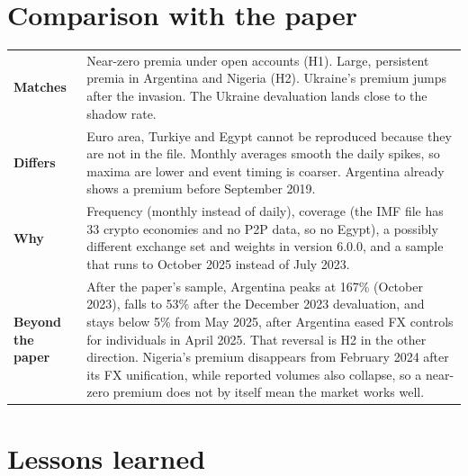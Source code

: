 \documentclass[11pt]{article}
\begin{document}
\section{Comparison with the paper}

\begin{tabular}{p{}p{}}
\toprule
\textbf{Matches} & Near-zero premia under open accounts (H1). Large, persistent premia in Argentina and Nigeria (H2). Ukraine's premium jumps after the invasion. The Ukraine devaluation lands close to the shadow rate. \\
\textbf{Differs} & Euro area, Turkiye and Egypt cannot be reproduced because they are not in the file. Monthly averages smooth the daily spikes, so maxima are lower and event timing is coarser. Argentina already shows a premium before September 2019. \\
\textbf{Why} & Frequency (monthly instead of daily), coverage (the IMF file has 33 crypto economies and no P2P data, so no Egypt), a possibly different exchange set and weights in version 6.0.0, and a sample that runs to October 2025 instead of July 2023. \\
\textbf{Beyond the paper} & After the paper's sample, Argentina peaks at 167\% (October 2023), falls to 53\% after the December 2023 devaluation, and stays below 5\% from May 2025, after Argentina eased FX controls for individuals in April 2025. That reversal is H2 in the other direction. Nigeria's premium disappears from February 2024 after its FX unification, while reported volumes also collapse, so a near-zero premium does not by itself mean the market works well. \\
\bottomrule
\end{tabular}

\section{Lessons learned}
\end{document}
